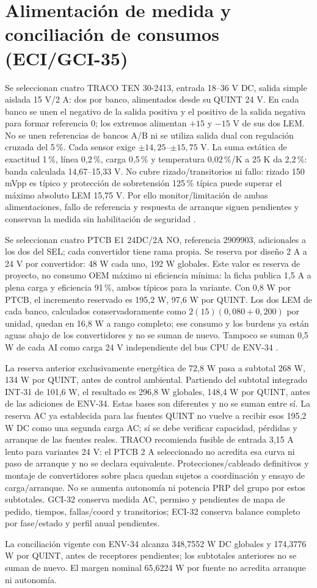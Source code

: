 \section{Alimentación de medida y conciliación de consumos (ECI/GCI-35)}
\label{sec:sd4-alimentacion-eci35}
Se seleccionan cuatro TRACO TEN 30-2413, entrada 18--36 V DC, salida simple aislada 15 V/2 A: dos por banco, alimentados desde su QUINT 24 V. En cada banco se unen el negativo de la salida positiva y el positivo de la salida negativa para formar referencia 0; los extremos alimentan $+15$ y $-15$ V de sus dos LEM. No se unen referencias de bancos A/B ni se utiliza salida dual con regulación cruzada del 5\,\%. Cada sensor exige $\pm14,25$--$\pm15,75$ V. La suma estática de exactitud 1\,\%, línea 0,2\,\%, carga 0,5\,\% y temperatura 0,02\,\%/K a 25 K da 2,2\,\%: banda calculada 14,67--15,33 V. No cubre rizado/transitorios ni fallo: rizado 150 mVpp es típico y protección de sobretensión 125\,\% típica puede superar el máximo absoluto LEM 15,75 V. Por ello monitor/limitación de ambas alimentaciones, fallo de referencia y respuesta de arranque siguen pendientes y conservan la medida sin habilitación de seguridad \parencites[pp.~1--4]{lote35-ten30}[pp.~3 y 5]{lote35-lem200}.

Se seleccionan cuatro PTCB E1 24DC/2A NO, referencia 2909903, adicionales a los dos del SEL; cada convertidor tiene rama propia. Se reserva por diseño 2 A a 24 V por convertidor: 48 W cada uno, 192 W globales. Este valor es reserva de proyecto, no consumo OEM máximo ni eficiencia mínima: la ficha publica 1,5 A a plena carga y eficiencia 91\,\%, ambos típicos para la variante. Con 0,8 W por PTCB, el incremento reservado es 195,2 W, 97,6 W por QUINT. Los dos LEM de cada banco, calculados conservadoramente como $2(15)(0,080+0,200)$ por unidad, quedan en 16,8 W a rango completo; ese consumo y los burdens ya están aguas abajo de los convertidores y no se suman de nuevo. Tampoco se suman 0,5 W de cada AI como carga 24 V independiente del bus CPU de ENV-34 \parencites[pp.~1--3]{lote35-ten30}[p.~5]{lote35-lem200}{lote29-ptcb2}.

La reserva anterior exclusivamente energética de 72,8 W pasa a subtotal 268 W, 134 W por QUINT, antes de control ambiental. Partiendo del subtotal integrado INT-31 de 101,6 W, el resultado es 296,8 W globales, 148,4 W por QUINT, antes de las adiciones de ENV-34. Estas bases son diferentes y no se suman entre sí. La reserva AC ya establecida para las fuentes QUINT no vuelve a recibir esos 195,2 W DC como una segunda carga AC; sí se debe verificar capacidad, pérdidas y arranque de las fuentes reales. TRACO recomienda fusible de entrada 3,15 A lento para variantes 24 V: el PTCB 2 A seleccionado no acredita esa curva ni paso de arranque y no se declara equivalente. Protecciones/cableado definitivos y montaje de convertidores sobre placa quedan sujetos a coordinación y ensayo de carga/arranque. No se aumenta autonomía ni potencia PRP del grupo por estos subtotales. GCI-32 conserva medida AC, permiso y pendientes de mapa de pedido, tiempos, fallas/coord y transitorios; ECI-32 conserva balance completo por fase/estado y perfil anual pendientes.

La conciliación vigente con ENV-34 alcanza 348,7552 W DC globales y 174,3776 W por QUINT, antes de receptores pendientes; los subtotales anteriores no se suman de nuevo. El margen nominal 65,6224 W por fuente no acredita arranque ni autonomía.
